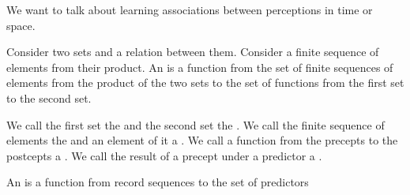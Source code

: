 

We want to talk about learning
associations between perceptions
in time or space.


Consider two sets
and a relation between them.
Consider a finite sequence of elements
from their product.
An  is a function
from the set of finite sequences of
elements from the product of the two
sets to the set of functions from
the first set to the second set.

We call the first set the
 and the second
set the
.
We call the finite sequence of
elements the 
and an element of it a .
We call a function from the precepts
to the postcepts a .
We call the result of a precept
under a predictor a .

An  is a function
from record sequences to the
set of predictors
